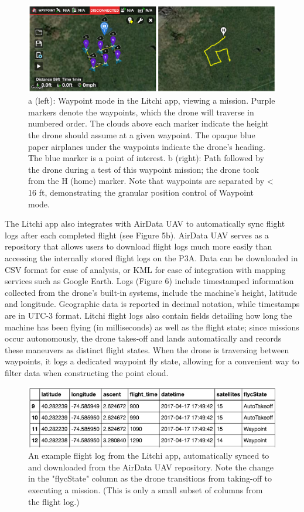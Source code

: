 \documentclass[pageno]{jpaper}
\begin{document}
\begin{figure}[h]
	\caption{a (left): Waypoint mode in the Litchi app, viewing a mission. Purple markers denote the waypoints, which the drone will traverse in numbered order. The clouds above each marker indicate the height the drone should assume at a given waypoint. The opaque blue paper airplanes under the waypoints indicate the drone's heading. The blue marker is a point of interest. b (right): Path followed by the drone during a test of this waypoint mission; the drone took from the H (home) marker. Note that waypoints are separated by < 16 ft, demonstrating the granular position control of Waypoint mode.}
	\includegraphics{waypoint}
	\centering
\end{figure}

The Litchi app also integrates with AirData UAV to automatically sync flight logs after each completed flight (see Figure 5b). AirData UAV serves as a repository that allows users to download flight logs much more easily than accessing the internally stored flight logs on the P3A. Data can be downloaded in CSV format for ease of analysis, or KML for ease of integration with mapping services such as Google Earth. Logs (Figure 6) include timestamped information collected from the drone's built-in systems, include the machine's height, latitude and longitude. Geographic data is reported in decimal notation, while timestamps are in UTC-3 format. Litchi flight logs also contain fields detailing how long the machine has been flying (in milliseconds) as well as the flight state; since missions occur autonomously, the drone takes-off and lands automatically and records these maneuvers as distinct flight states. When the drone is traversing between waypoints, it logs a dedicated waypoint fly state, allowing for a convenient way to filter data when constructing the point cloud. 

\begin{figure}[h]
	\caption{An example flight log from the Litchi app, automatically synced to and downloaded from the AirData UAV repository. Note the change in the "flycState" column as the drone transitions from taking-off to executing a mission. (This is only a small subset of columns from the flight log.)}
	\includegraphics{flight_log}
	\centering
\end{figure}
\end{document}
